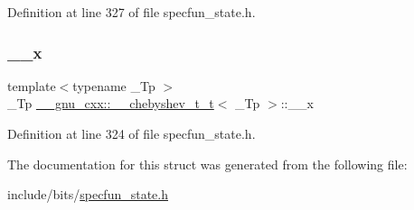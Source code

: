 Definition at line 327 of file specfun\+\_\+state.\+h.

\mbox{\label{struct____gnu__cxx_1_1____chebyshev__t__t_adc03ac0a37e1d895bd74330772146eb7}} 
\subsubsection{\texorpdfstring{\+\_\+\+\_\+x}{\_\_x}}
{\footnotesize\ttfamily template$<$typename \+\_\+\+Tp $>$ \\
\+\_\+\+Tp \hyperlink{struct____gnu__cxx_1_1____chebyshev__t__t}{\+\_\+\+\_\+gnu\+\_\+cxx\+::\+\_\+\+\_\+chebyshev\+\_\+t\+\_\+t}$<$ \+\_\+\+Tp $>$\+::\+\_\+\+\_\+x}



Definition at line 324 of file specfun\+\_\+state.\+h.



The documentation for this struct was generated from the following file\+:\begin{DoxyCompactItemize}
\item 
include/bits/\hyperlink{specfun__state_8h}{specfun\+\_\+state.\+h}\end{DoxyCompactItemize}

